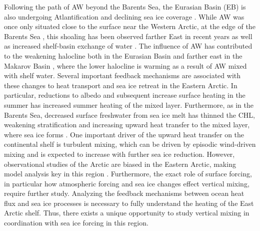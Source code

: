\documentclass[a4paper,12pt]{article}
\begin{document}
    Following the path of AW beyond the Barents Sea, the Eurasian Basin (EB) is also undergoing Atlantification and declining sea ice coverage \cite{Polyakov2017}. While AW was once only situated close to the surface near the Western Arctic, at the edge of the Barents Sea \cite{Schulz2022}, this shoaling has been observed farther East in recent years \cite{Polyakov2017} as well as increased shelf-basin exchange of water \cite{Williams2015}. The influence of AW has contributed to the weakening halocline both in the Eurasian Basin \cite{Polyakov2017} and farther east in the Makarov Basin \cite{Bertosio2022}, where the lower halocline is warming as a result of AW mixed with shelf water. Several important feedback mechanisms are associated with these changes to heat transport and sea ice retreat in the Eastern Arctic. In particular, reductions to albedo and subsequent increase surface heating in the summer \cite{Metzner2020} has increased summer heating of the mixed layer. Furthermore, as in the Barents Sea, decreased surface freshwater from sea ice melt has thinned the CHL, weakening stratification and increasing upward heat transfer to the mixed layer, where sea ice forms \cite{Polyakov2020}. One important driver of the upward heat transfer on the continental shelf is turbulent mixing, which can be driven by episodic wind-driven mixing \cite{Polyakov2020,Schulz2022} and is expected to increase with further sea ice reduction. However, observational studies of the Arctic are biased in the Eastern Arctic, making model analysis key in this region \cite{Lopez_Blanco2024}. Furthermore, the exact role of surface forcing, in particular how atmospheric forcing and sea ice changes effect vertical mixing, require further study. Analyzing the feedback mechanisms between ocean heat flux and sea ice processes is necessary to fully understand the heating of the East Arctic shelf. Thus, there exists a unique opportunity to study vertical mixing in coordination with sea ice forcing in this region.
    
\end{document}
